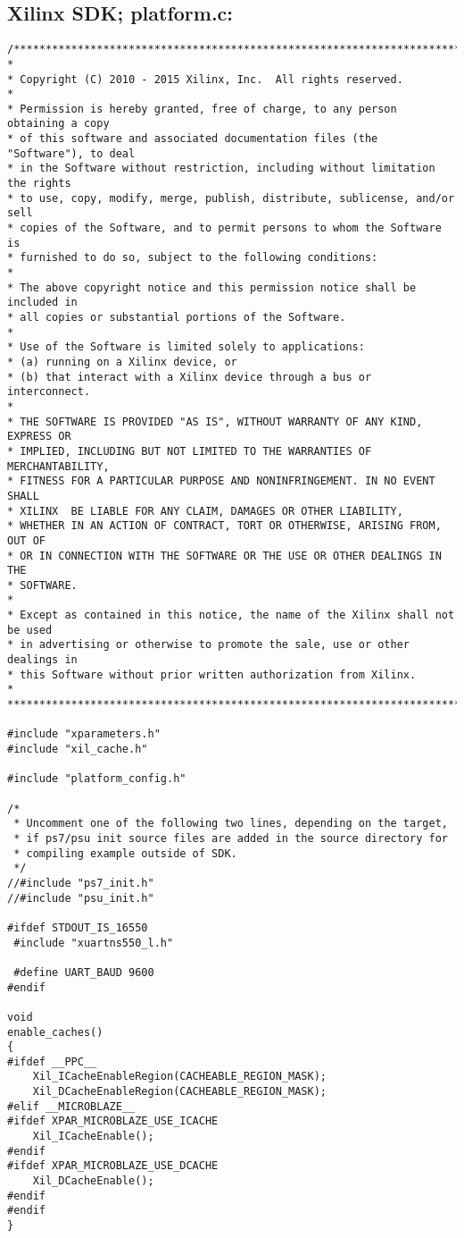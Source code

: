 \subsection{Xilinx SDK; platform.c:}
\label{anhang:platform.c}
\lstset{language=c}
\begin{lstlisting}
/******************************************************************************
*
* Copyright (C) 2010 - 2015 Xilinx, Inc.  All rights reserved.
*
* Permission is hereby granted, free of charge, to any person obtaining a copy
* of this software and associated documentation files (the "Software"), to deal
* in the Software without restriction, including without limitation the rights
* to use, copy, modify, merge, publish, distribute, sublicense, and/or sell
* copies of the Software, and to permit persons to whom the Software is
* furnished to do so, subject to the following conditions:
*
* The above copyright notice and this permission notice shall be included in
* all copies or substantial portions of the Software.
*
* Use of the Software is limited solely to applications:
* (a) running on a Xilinx device, or
* (b) that interact with a Xilinx device through a bus or interconnect.
*
* THE SOFTWARE IS PROVIDED "AS IS", WITHOUT WARRANTY OF ANY KIND, EXPRESS OR
* IMPLIED, INCLUDING BUT NOT LIMITED TO THE WARRANTIES OF MERCHANTABILITY,
* FITNESS FOR A PARTICULAR PURPOSE AND NONINFRINGEMENT. IN NO EVENT SHALL
* XILINX  BE LIABLE FOR ANY CLAIM, DAMAGES OR OTHER LIABILITY,
* WHETHER IN AN ACTION OF CONTRACT, TORT OR OTHERWISE, ARISING FROM, OUT OF
* OR IN CONNECTION WITH THE SOFTWARE OR THE USE OR OTHER DEALINGS IN THE
* SOFTWARE.
*
* Except as contained in this notice, the name of the Xilinx shall not be used
* in advertising or otherwise to promote the sale, use or other dealings in
* this Software without prior written authorization from Xilinx.
*
******************************************************************************/

#include "xparameters.h"
#include "xil_cache.h"

#include "platform_config.h"

/*
 * Uncomment one of the following two lines, depending on the target,
 * if ps7/psu init source files are added in the source directory for
 * compiling example outside of SDK.
 */
//#include "ps7_init.h"
//#include "psu_init.h"

#ifdef STDOUT_IS_16550
 #include "xuartns550_l.h"

 #define UART_BAUD 9600
#endif

void
enable_caches()
{
#ifdef __PPC__
    Xil_ICacheEnableRegion(CACHEABLE_REGION_MASK);
    Xil_DCacheEnableRegion(CACHEABLE_REGION_MASK);
#elif __MICROBLAZE__
#ifdef XPAR_MICROBLAZE_USE_ICACHE
    Xil_ICacheEnable();
#endif
#ifdef XPAR_MICROBLAZE_USE_DCACHE
    Xil_DCacheEnable();
#endif
#endif
}


\end{lstlisting}
